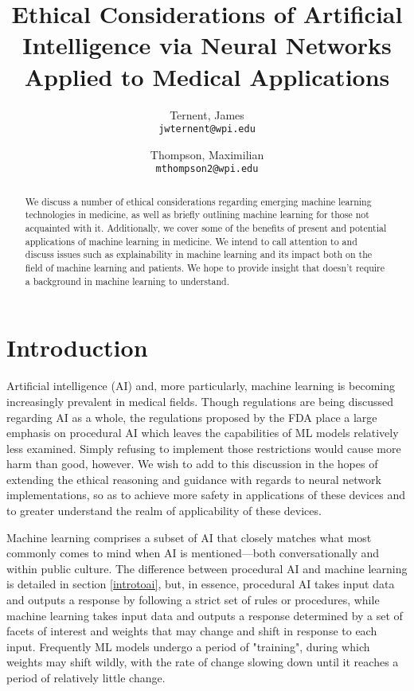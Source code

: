 \documentclass[]{article}
\title{Ethical Considerations of Artificial Intelligence via Neural Networks Applied to Medical Applications}
\author{
  Ternent, James\\
  \texttt{jwternent@wpi.edu}
  \and
  Thompson, Maximilian\\
  \texttt{mthompson2@wpi.edu}
}
\begin{document}
	
	\maketitle
	
	\begin{abstract}
		We discuss a number of ethical considerations regarding emerging machine learning technologies in medicine, as well as briefly outlining machine learning for those not acquainted with it. Additionally, we cover some of the benefits of present and potential applications of machine learning in medicine. We intend to call attention to and discuss issues such as explainability in machine learning and its impact both on the field of machine learning and patients. We hope to provide insight that doesn't require a background in machine learning to understand.
	\end{abstract}
	
	\section{Introduction}
	
		Artificial intelligence (AI) and, more particularly, machine learning is becoming increasingly prevalent in medical fields. Though regulations are being discussed regarding AI as a whole, the regulations proposed by the FDA\cite{fdaregproposal} place a large emphasis on procedural AI which leaves the capabilities of ML models relatively less examined. Simply refusing to implement those restrictions would cause more harm than good, however. We wish to add to this discussion in the hopes of extending the ethical reasoning and guidance with regards to neural network implementations, so as to achieve more safety in applications of these devices and to greater understand the realm of applicability of these devices.

		Machine learning comprises a subset of AI that closely matches what most commonly comes to mind when AI is mentioned---both conversationally and within public culture. The difference between procedural AI and machine learning is detailed in section \ref{introtoai}, but, in essence, procedural AI takes input data and outputs a response by following a strict set of rules or procedures, while machine learning takes input data and outputs a response determined by a set of facets of interest and weights that may change and shift in response to each input. Frequently ML models undergo a period of "training", during which weights may shift wildly, with the rate of change slowing down until it reaches a period of relatively little change.
\end{document}
